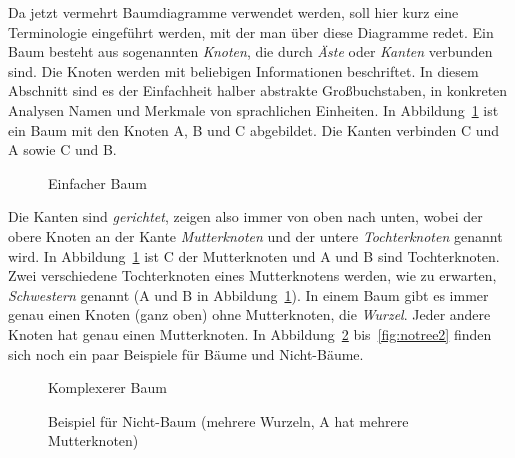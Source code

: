 \label{sec:baumterminologie}


Da jetzt vermehrt Baumdiagramme verwendet werden, soll hier kurz eine Terminologie eingeführt werden, mit der man über diese Diagramme redet.
Ein Baum besteht aus sogenannten \textit{Knoten}, die durch \textit{Äste} oder \textit{Kanten} verbunden sind.
Die Knoten werden mit beliebigen Informationen beschriftet.
In diesem Abschnitt sind es der Einfachheit halber abstrakte Großbuchstaben, in konkreten Analysen Namen und Merkmale von sprachlichen Einheiten.
In Abbildung~\ref{fig:baumschema} ist ein Baum mit den Knoten A, B und C abgebildet.
Die Kanten verbinden C und A sowie C und B.


\begin{figure}[!htbp]
  \centering
  \caption{Einfacher Baum}
  \label{fig:baumschema}
\end{figure}


Die Kanten sind \textit{gerichtet}, zeigen also immer von oben nach unten, wobei der obere Knoten an der Kante \textit{Mutterknoten} und der untere \textit{Tochterknoten} genannt wird.
In Abbildung~\ref{fig:baumschema} ist C der Mutterknoten und A und B sind Tochterknoten.
Zwei verschiedene Tochterknoten eines Mutterknotens werden, wie zu erwarten, \textit{Schwestern} genannt (\zB A und B in Abbildung~\ref{fig:baumschema}).
In einem Baum gibt es immer genau einen Knoten (ganz oben) ohne Mutterknoten, die \textit{Wurzel}.
Jeder andere Knoten hat genau einen Mutterknoten.
In Abbildung~\ref{fig:ctree} bis~\ref{fig:notree2} finden sich noch ein paar Beispiele für Bäume und Nicht-Bäume.

\begin{figure}[!htbp]
  \centering
  \caption{Komplexerer Baum}
  \label{fig:ctree}
\end{figure}

\begin{figure}[!htbp]
  \centering
  \caption[Beispiel für Nicht-Baum]{Beispiel für Nicht-Baum (mehrere Wurzeln, A hat mehrere Mutterknoten)}
  \label{fig:notree1}
\end{figure}

